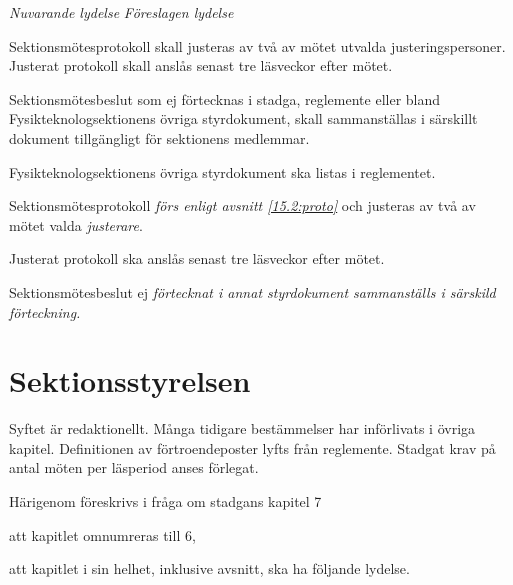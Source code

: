 \documentclass{article}
\newenvironment{lydelse}
    {\begin{paracol}{2}%
        \emph{Nuvarande lydelse}%
        \switchcolumn%
        \emph{Föreslagen lydelse}%
    \end{paracol}%
    \begin{enumerate}[label=\thesubsection.\arabic*]%
    \begin{paracol}{2}%
    }{\end{paracol}\end{enumerate}}
\begin{document}
\begin{lydelse}
  \setcounter{subsection}{14}
  \item Sektionsmötesprotokoll skall justeras av två av mötet utvalda
  justeringspersoner. Justerat protokoll skall anslås senast tre
  läsveckor efter mötet.

  \setcounter{subsection}{15}
  \setcounter{enumi}{0}
  \item Sektionsmötesbeslut som ej förtecknas i stadga, reglemente eller bland Fysikteknologsektionens övriga styrdokument, skall sammanställas i särskillt dokument tillgängligt för sektionens medlemmar.

  \item Fysikteknologsektionens övriga styrdokument ska listas i reglementet.
  
  \switchcolumn
  \setcounter{subsection}{5}
  \setcounter{enumi}{0}

  \item Sektionsmötesprotokoll \emph{förs enligt avsnitt \ref{15.2:proto}} och justeras av två av mötet valda \emph{justerare}.

  \item Justerat protokoll ska anslås senast tre läsveckor efter mötet.

  \item Sektionsmötesbeslut ej \emph{förtecknat i annat styrdokument sammanställs i särskild förteckning.}
\end{lydelse}

\section{Sektionsstyrelsen}
Syftet är redaktionellt.
Många tidigare bestämmelser har införlivats i övriga kapitel.
Definitionen av förtroendeposter lyfts från reglemente.
Stadgat krav på antal möten per läsperiod anses förlegat.

Härigenom föreskrivs i fråga om stadgans kapitel 7
\begin{dels}
  \item att kapitlet omnumreras till 6,
  \item att kapitlet i sin helhet, inklusive avsnitt, ska ha följande lydelse.
\end{dels}
\end{document}
